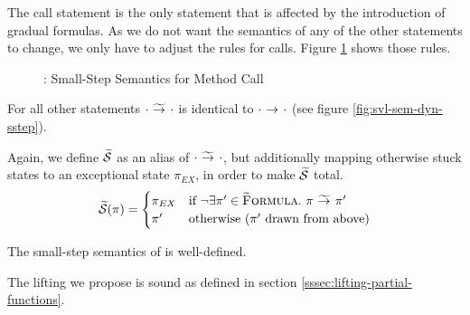 The call statement is the only statement that is affected by the introduction of gradual formulas.
As we do not want the semantics of any of the other statements to change, we only have to adjust the rules for calls.
Figure \ref{fig:gvl-sem-dyn-sstep} shows those rules.
\begin{figure}
    \boxed{\gsstep{\pi}{\pi}}
    
    \caption{\gvlidf: Small-Step Semantics for Method Call}
    \label{fig:gvl-sem-dyn-sstep}
\end{figure}
For all other statements ${\cdot} \,\,{\widetilde{\rightarrow}^{}}\,\, {\cdot}$ is identical to ${\cdot} \,\,{\rightarrow^{}}\,\, {\cdot}$ (see figure \ref{fig:svl-sem-dyn-sstep}).

Again, we define $\widetilde{\mathcal{S}}$ as an alias of ${\cdot} \,\,{\widetilde{\rightarrow}^{}}\,\, {\cdot}$, but additionally mapping otherwise stuck states to an exceptional state $\pi_{EX}$, in order to make $\widetilde{\mathcal{S}}$ total.
\begin{displaymath}
\widetilde{\mathcal{S}}(\pi) = 
\begin{cases}
	\pi_{EX} & \text {if } \neg \exists \pi' \in \textup{\textsc{\ensuremath{\widetilde{\text{F}}}ormula}}.~ {\pi} \,\,{\widetilde{\rightarrow}^{}}\,\, {\pi'} \\
	\pi'     & \text {otherwise ($\pi'$ drawn from above)}
\end{cases}
\end{displaymath}


\begin{lemma}
    The small-step semantics of \gvlidf is well-defined.
\end{lemma}

\begin{lemma}
    The lifting we propose is sound as defined in section \ref{sssec:lifting-partial-functions}.
\end{lemma}